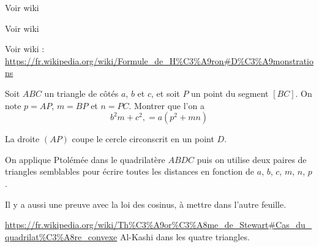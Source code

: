 \begin{exo}
Voir wiki
\begin{hint}
\end{hint}
\begin{sol}
\end{sol}
\end{exo}

\begin{exo}
Voir wiki
\begin{hint}
\end{hint}
\begin{sol}
\end{sol}
\end{exo}

\begin{exo}
Voir wiki : \url{https://fr.wikipedia.org/wiki/Formule_de_H%C3%A9ron#D%C3%A9monstrations}
\begin{hint}
\end{hint}
\begin{sol}
\end{sol}
\end{exo}


\begin{exo}
Soit $ABC$ un triangle de côtés $a$, $b$ et $c$, et soit $P$ un point du segment $[BC]$. On note $p=AP$, $m=BP$ et $n=PC$.
Montrer que l'on a 
\[ b^2m+c^2,=a(p^2+mn)\]
\begin{hint}
La droite $(AP)$ coupe le cercle circonscrit en un point $D$. 
\end{hint}
\begin{sol}
On applique Ptolémée dans le quadrilatère $ABDC$ puis on utilise deux paires de triangles semblables pour écrire toutes les distances en fonction de $a$, $b$, $c$, $m$, $n$, $p$.

Il y a aussi une preuve avec la loi des cosinus, à mettre dans l'autre feuille.
\end{sol}
\end{exo}


\begin{exo}

\url{https://fr.wikipedia.org/wiki/Th%C3%A9or%C3%A8me_de_Stewart#Cas_du_quadrilat%C3%A8re_convexe}
Al-Kashi dans les quatre triangles.
\begin{hint}
\end{hint}
\begin{sol}
\end{sol}
\end{exo}


